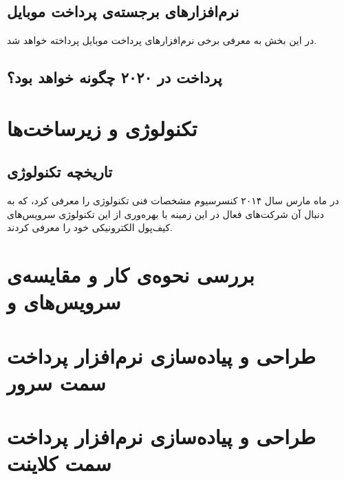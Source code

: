 \documentclass[oneside]{report}
\begin{document}
	\section{‌‌نرم‌افزار‌های برجسته‌ی پرداخت موبایل }		
		در این بخش به معرفی برخی نرم‌افزار‌های پرداخت موبایل پرداخته خواهد شد.
		
		
	\section{پرداخت در ۲۰۲۰ چگونه خواهد بود؟}
	
		\cite{2020payments}
		
		
		
		
		
		
		
		\chapter{تکنولوژی {\Large{}} و زیرساخت‌ها }\label{tokenisation}
					\section{تاریخچه تکنولوژی{\large  {}}}
					در ماه مارس سال ۲۰۱۴ کنسرسیوم 
					{\large {}} 
					مشخصات فنی تکنولوژی 
					{\large {}} 
					را معرفی کرد، که به دنبال آن شرکت‌های فعال در این زمینه با بهره‌وری از این تکنولوژی سرویس‌های کیف‌پول الکترونیکی خود را معرفی کردند.
					
					
					
					
		\chapter{بررسی نحوه‌ی کار و مقایسه‌ی  سرویس‌های   {\Large{} }  و   {\Large{} }}\label{comparison}
		
		\chapter{طراحی و پیاده‌سازی نرم‌افزار پرداخت سمت سرور}\label{serverimplementation}
		
		\chapter{طراحی و پیاده‌سازی نرم‌افزار پرداخت سمت کلاینت}\label{clientimplementation}
		
	
	
	\newpage
	\def\bibname{مراجع}
	
	
\end{document}
